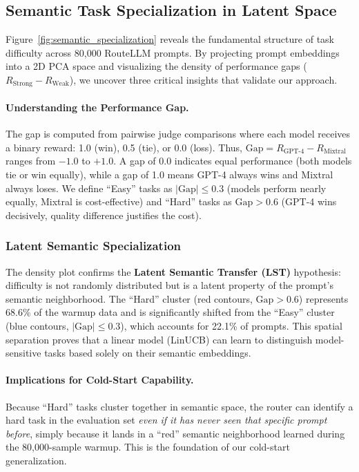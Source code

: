 
\subsection{Semantic Task Specialization in Latent Space}

Figure~\ref{fig:semantic_specialization} reveals the fundamental structure of task difficulty across 80,000 RouteLLM prompts.
By projecting prompt embeddings into a 2D PCA space and visualizing the density of performance gaps ($R_{\text{Strong}} - R_{\text{Weak}}$), we uncover three critical insights that validate our approach.

\paragraph{Understanding the Performance Gap.}
The gap is computed from pairwise judge comparisons where each model receives a binary reward: 1.0 (win), 0.5 (tie), or 0.0 (loss).
Thus, $\text{Gap} = R_{\text{GPT-4}} - R_{\text{Mixtral}}$ ranges from $-1.0$ to $+1.0$.
A gap of 0.0 indicates equal performance (both models tie or win equally), while a gap of 1.0 means GPT-4 always wins and Mixtral always loses.
We define ``Easy'' tasks as $|\text{Gap}| \le 0.3$ (models perform nearly equally, Mixtral is cost-effective) and ``Hard'' tasks as $\text{Gap} > 0.6$ (GPT-4 wins decisively, quality difference justifies the cost).

\subsubsection{Latent Semantic Specialization}

The density plot confirms the \textbf{Latent Semantic Transfer (LST)} hypothesis: difficulty is not randomly distributed but is a latent property of the prompt's semantic neighborhood.
The ``Hard'' cluster (red contours, $\text{Gap} > 0.6$) represents 68.6\% of the warmup data and is significantly shifted from the ``Easy'' cluster (blue contours, $|\text{Gap}| \le 0.3$), which accounts for 22.1\% of prompts.
This spatial separation proves that a linear model (LinUCB) can learn to distinguish model-sensitive tasks based solely on their semantic embeddings.

\paragraph{Implications for Cold-Start Capability.}
Because ``Hard'' tasks cluster together in semantic space, the router can identify a hard task in the evaluation set \emph{even if it has never seen that specific prompt before}, simply because it lands in a ``red'' semantic neighborhood learned during the 80,000-sample warmup.
This is the foundation of our cold-start generalization.


